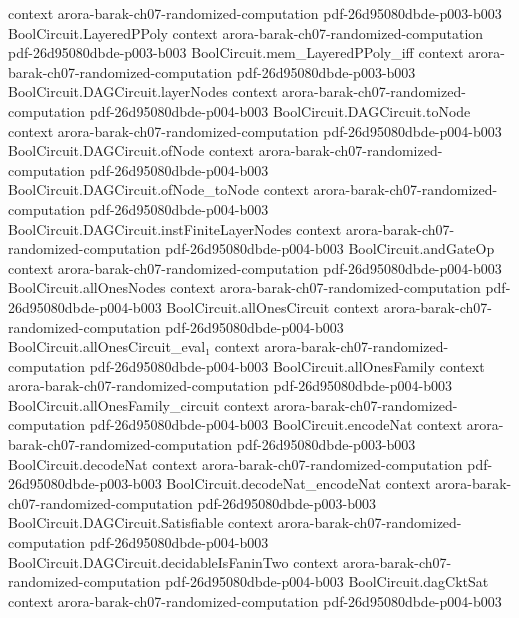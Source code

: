 \begin{theorem}
  {context}
  {arora-barak-ch07-randomized-computation}
  {pdf-26d95080dbde-p003-b003}
\proofstep
  {BoolCircuit.LayeredPPoly}
  {context}
  {arora-barak-ch07-randomized-computation}
  {pdf-26d95080dbde-p003-b003}
\proofstep
  {BoolCircuit.mem_LayeredPPoly_iff}
  {context}
  {arora-barak-ch07-randomized-computation}
  {pdf-26d95080dbde-p003-b003}
\proofstep
  {BoolCircuit.DAGCircuit.layerNodes}
  {context}
  {arora-barak-ch07-randomized-computation}
  {pdf-26d95080dbde-p004-b003}
\proofstep
  {BoolCircuit.DAGCircuit.toNode}
  {context}
  {arora-barak-ch07-randomized-computation}
  {pdf-26d95080dbde-p004-b003}
\proofstep
  {BoolCircuit.DAGCircuit.ofNode}
  {context}
  {arora-barak-ch07-randomized-computation}
  {pdf-26d95080dbde-p004-b003}
\proofstep
  {BoolCircuit.DAGCircuit.ofNode_toNode}
  {context}
  {arora-barak-ch07-randomized-computation}
  {pdf-26d95080dbde-p004-b003}
\proofstep
  {BoolCircuit.DAGCircuit.instFiniteLayerNodes}
  {context}
  {arora-barak-ch07-randomized-computation}
  {pdf-26d95080dbde-p004-b003}
\proofstep
  {BoolCircuit.andGateOp}
  {context}
  {arora-barak-ch07-randomized-computation}
  {pdf-26d95080dbde-p004-b003}
\proofstep
  {BoolCircuit.allOnesNodes}
  {context}
  {arora-barak-ch07-randomized-computation}
  {pdf-26d95080dbde-p004-b003}
\proofstep
  {BoolCircuit.allOnesCircuit}
  {context}
  {arora-barak-ch07-randomized-computation}
  {pdf-26d95080dbde-p004-b003}
\proofstep
  {BoolCircuit.allOnesCircuit_eval₁}
  {context}
  {arora-barak-ch07-randomized-computation}
  {pdf-26d95080dbde-p004-b003}
\proofstep
  {BoolCircuit.allOnesFamily}
  {context}
  {arora-barak-ch07-randomized-computation}
  {pdf-26d95080dbde-p004-b003}
\proofstep
  {BoolCircuit.allOnesFamily_circuit}
  {context}
  {arora-barak-ch07-randomized-computation}
  {pdf-26d95080dbde-p004-b003}
\proofstep
  {BoolCircuit.encodeNat}
  {context}
  {arora-barak-ch07-randomized-computation}
  {pdf-26d95080dbde-p003-b003}
\proofstep
  {BoolCircuit.decodeNat}
  {context}
  {arora-barak-ch07-randomized-computation}
  {pdf-26d95080dbde-p003-b003}
\proofstep
  {BoolCircuit.decodeNat_encodeNat}
  {context}
  {arora-barak-ch07-randomized-computation}
  {pdf-26d95080dbde-p003-b003}
\proofstep
  {BoolCircuit.DAGCircuit.Satisfiable}
  {context}
  {arora-barak-ch07-randomized-computation}
  {pdf-26d95080dbde-p004-b003}
\proofstep
  {BoolCircuit.DAGCircuit.decidableIsFaninTwo}
  {context}
  {arora-barak-ch07-randomized-computation}
  {pdf-26d95080dbde-p004-b003}
\proofstep
  {BoolCircuit.dagCktSat}
  {context}
  {arora-barak-ch07-randomized-computation}
  {pdf-26d95080dbde-p004-b003}

\end{theorem}
